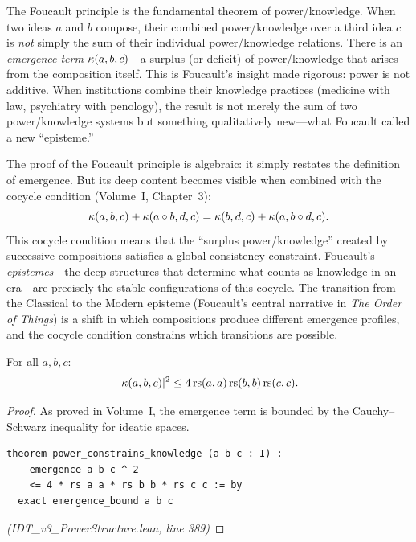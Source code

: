 \begin{interpretation}
The Foucault principle is the fundamental theorem of power/knowledge. When two
ideas $a$ and $b$ compose, their combined power/knowledge over a third idea $c$
is \emph{not} simply the sum of their individual power/knowledge relations.
There is an \emph{emergence term} $\kappa(a,b,c)$---a surplus (or deficit) of
power/knowledge that arises from the composition itself. This is Foucault's
insight made rigorous: power is not additive. When institutions combine their
knowledge practices (medicine with law, psychiatry with penology), the result
is not merely the sum of two power/knowledge systems but something qualitatively
new---what Foucault called a new ``episteme.''
\end{interpretation}

\begin{remark}
The proof of the Foucault principle is algebraic: it simply restates the
definition of emergence. But its deep content becomes visible when combined
with the cocycle condition (Volume~I, Chapter~3):
\[
  \kappa(a,b,c) + \kappa(a \circ b, d, c) = \kappa(b,d,c) + \kappa(a, b \circ d, c).
\]
This cocycle condition means that the ``surplus power/knowledge'' created by
successive compositions satisfies a global consistency constraint. Foucault's
\emph{epistemes}---the deep structures that determine what counts as knowledge
in an era---are precisely the stable configurations of this cocycle. The
transition from the Classical to the Modern episteme (Foucault's central
narrative in \emph{The Order of Things}) is a shift in which compositions
produce different emergence profiles, and the cocycle condition constrains
which transitions are possible.
\end{remark}

\begin{theorem}
\label{thm:power-constrains}
For all $a, b, c$:
\[
  |\kappa(a, b, c)|^2 \leq 4\,\mathrm{rs}(a,a)\,\mathrm{rs}(b,b)\,\mathrm{rs}(c,c).
\]
\end{theorem}

\begin{proof}
As proved in Volume~I, the emergence term is bounded by the Cauchy--Schwarz
inequality for ideatic spaces.
\begin{lstlisting}
theorem power_constrains_knowledge (a b c : I) :
    emergence a b c ^ 2
    <= 4 * rs a a * rs b b * rs c c := by
  exact emergence_bound a b c
\end{lstlisting}
\textit{(IDT\_v3\_PowerStructure.lean, line 389)}
\end{proof}

